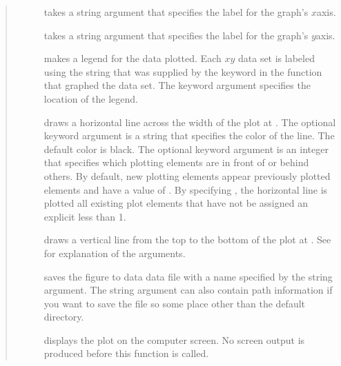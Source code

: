 \documentclass[letterpaper,10pt,english]{sphinxmanual}
\begin{document}
\begin{quote}
\begin{description}
\item[{  \sphinxcode{\sphinxupquote{)}}}] \leavevmode
\sphinxAtStartPar
takes a string argument that specifies the label for the graph’s \(x\)\sphinxhyphen{}axis.

\item[{  \sphinxcode{\sphinxupquote{)}}}] \leavevmode
\sphinxAtStartPar
takes a string argument that specifies the label for the graph’s \(y\)\sphinxhyphen{}axis.

\item[{}] \leavevmode
\sphinxAtStartPar
makes a legend for the data plotted.  Each \(x\)\sphinxhyphen{}\(y\) data set is labeled  using the string that was supplied by the  keyword in the  function that graphed the data set.  The  keyword argument specifies the location of the legend.

\item[{}] \leavevmode
\sphinxAtStartPar
draws a horizontal line across the width of the plot at .  The optional keyword argument  is a string that specifies the color of the line.  The default color is black.  The optional keyword argument  is an integer that specifies which plotting elements are in front of or behind others.  By default, new plotting elements appear  previously plotted elements and have a value of .  By specifying , the horizontal line is plotted  all existing plot elements that have not be assigned an explicit  less than \sphinxhyphen{}1.

\item[{}] \leavevmode
\sphinxAtStartPar
draws a vertical line from the top to the bottom of the plot at .  See  for explanation of the arguments.

\item[{  \sphinxcode{\sphinxupquote{)}}}] \leavevmode
\sphinxAtStartPar
saves the figure to data data file with a name specified by the string argument.  The string argument can also contain path information if you want to save the file so some place other than the default directory.

\item[{}] \leavevmode
\sphinxAtStartPar
displays the plot on the computer screen.  No screen output is produced before this function is called.

\end{description}
\end{quote}
\end{document}
